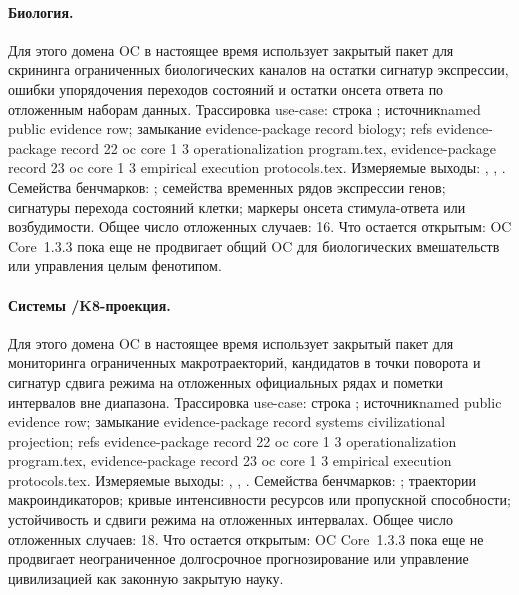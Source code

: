 \paragraph{Биология.}
Для этого домена OC в настоящее время использует закрытый пакет для скрининга ограниченных биологических каналов на остатки сигнатур экспрессии, ошибки упорядочения переходов состояний и остатки онсета ответа по отложенным наборам данных.
Трассировка use-case: строка ; \allowbreak источникnamed public evidence row; \allowbreak замыкание evidence-package record biology; \allowbreak refs evidence-package record 22 oc core 1 3 operationalization program.tex, \allowbreak evidence-package record 23 oc core 1 3 empirical execution protocols.tex.
Измеряемые выходы: , , .
Семейства бенчмарков: ; семейства временных рядов экспрессии генов; сигнатуры перехода состояний клетки; маркеры онсета стимула-ответа или возбудимости.
Общее число отложенных случаев: 16.
Что остается открытым: OC Core~1.3.3 пока еще не продвигает общий OC для биологических вмешательств или управления целым фенотипом.

\paragraph{Системы /\allowbreak K8-проекция.}
Для этого домена OC в настоящее время использует закрытый пакет для мониторинга ограниченных макротраекторий, кандидатов в точки поворота и сигнатур сдвига режима на отложенных официальных рядах и пометки интервалов вне диапазона.
Трассировка use-case: строка ; \allowbreak источникnamed public evidence row; \allowbreak замыкание evidence-package record systems civilizational projection; \allowbreak refs evidence-package record 22 oc core 1 3 operationalization program.tex, \allowbreak evidence-package record 23 oc core 1 3 empirical execution protocols.tex.
Измеряемые выходы: , , .
Семейства бенчмарков: ; траектории макроиндикаторов; кривые интенсивности ресурсов или пропускной способности; устойчивость и сдвиги режима на отложенных интервалах.
Общее число отложенных случаев: 18.
Что остается открытым: OC Core~1.3.3 пока еще не продвигает неограниченное долгосрочное прогнозирование или управление цивилизацией как законную закрытую науку.

